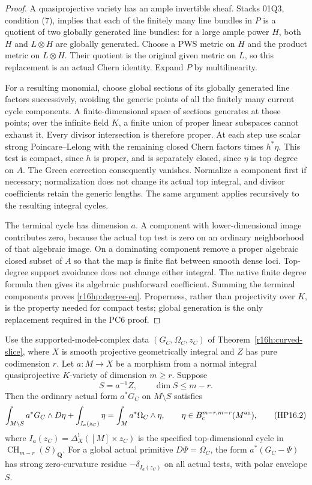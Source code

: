 \begin{proof}
A quasiprojective variety has an ample invertible sheaf. Stacks 01Q3,
condition (7), implies that each of the finitely many line bundles in
$P$ is a quotient of two globally generated line bundles: for a large
ample power $H$, both $H$ and $L\otimes H$ are globally generated.
Choose a PWS metric on $H$ and the product metric on $L\otimes H$.
Their quotient is the original given metric on $L$, so this replacement
is an actual Chern identity. Expand $P$ by multilinearity.

For a resulting monomial, choose global sections of its globally
generated line factors successively, avoiding the generic points of
all the finitely many current cycle components. A finite-dimensional
space of sections generates at those points; over the infinite field
$K$, a finite union of proper linear subspaces cannot exhaust it.
Every divisor intersection is therefore proper. At each step use
scalar strong Poincare--Lelong with the remaining closed Chern factors
times $h^*\eta$. This test is compact, since $h$ is proper, and is
separately closed, since $\eta$ is top degree on $A$. The Green
correction consequently vanishes. Normalize a component first if
necessary; normalization does not change its actual top integral,
and divisor coefficients retain the generic lengths. The same argument
applies recursively to the resulting integral cycles.

The terminal cycle has dimension $a$. A component with lower-dimensional
image contributes zero, because the actual top test is zero on an
ordinary neighborhood of that algebraic image. On a dominating
component remove a proper algebraic closed subset of $A$ so that the
map is finite flat between smooth dense loci. Top-degree support
avoidance does not change either integral. The native finite degree
formula then gives its algebraic pushforward coefficient. Summing the
terminal components proves \eqref{r16hp:degree-eq}. Properness, rather
than projectivity over $K$, is the property needed for compact tests;
global generation is the only replacement required in the PC6 proof.
\end{proof}

\begin{theorem}
\label{r16hp:residue}
Use the supported-model-complex data $(G_C,\Omega_C,z_C)$ of
Theorem~\ref{r16h:curved-slice}, where $X$ is smooth projective
geometrically integral and $Z$ has pure codimension $r$. Let
$a:M\to X$ be a morphism from a normal integral quasiprojective
$K$-variety of dimension $m\geq r$. Suppose
\[
                   S=a^{-1}Z,\qquad \dim S\leq m-r.
\]
Then the ordinary actual form $a^*G_C$ on $M\setminus S$ satisfies
\[
 \int_{M\setminus S}a^*G_C\wedge D\eta
       +\int_{I_a(z_C)}\eta
       =\int_M a^*\Omega_C\wedge\eta,
 \qquad \eta\in B_c^{m-r,m-r}(M^{\rm an}),
 \tag{HP16.2}\label{r16hp:residue-eq}
\]
where $I_a(z_C)=\Delta_X^!([M]\times z_C)$ is the specified
top-dimensional cycle in $\operatorname{CH}_{m-r}(S)_{\mathbf Q}$.
For a global actual primitive $D\Psi=\Omega_C$, the form
$a^*(G_C-\Psi)$ has strong zero-curvature residue $-\delta_{I_a(z_C)}$
on all actual tests, with polar envelope $S$.
\end{theorem}


